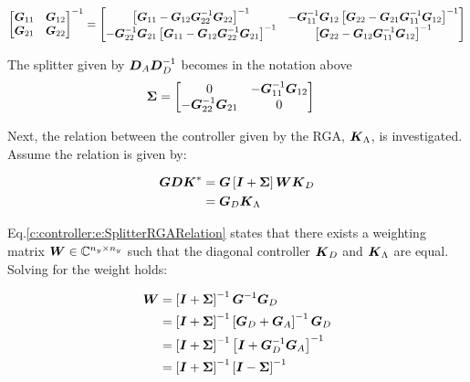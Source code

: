 \begin{align}
\begin{split}
\begin{bmatrix}
\mbox{\boldmath$G$}_{11} & \mbox{\boldmath$G$}_{12} \\
\mbox{\boldmath$G$}_{21} & \mbox{\boldmath$G$}_{22} 
\end{bmatrix}^{-1} &= \begin{bmatrix}
\left[\mbox{\boldmath$G$}_{11} - \mbox{\boldmath$G$}_{12}\mbox{\boldmath$G$}_{22}^{-1}\mbox{\boldmath$G$}_{22}\right]^{-1} & -\mbox{\boldmath$G$}_{11}^{-1}\mbox{\boldmath$G$}_{12}\left[\mbox{\boldmath$G$}_{22} - \mbox{\boldmath$G$}_{21}\mbox{\boldmath$G$}_{11}^{-1}\mbox{\boldmath$G$}_{12}\right]^{-1}  \\
-\mbox{\boldmath$G$}_{22}^{-1}\mbox{\boldmath$G$}_{21}\left[\mbox{\boldmath$G$}_{11} - \mbox{\boldmath$G$}_{12}\mbox{\boldmath$G$}_{22}^{-1}\mbox{\boldmath$G$}_{21}\right]^{-1}  & \left[\mbox{\boldmath$G$}_{22} - \mbox{\boldmath$G$}_{12}\mbox{\boldmath$G$}_{11}^{-1}\mbox{\boldmath$G$}_{12}\right]^{-1} 
\end{bmatrix} \\
\end{split}
\end{align}

The splitter given by $\mbox{\boldmath$D$}_A\mbox{\boldmath$D$}_D^{-1}$ becomes in the notation above
\begin{align}
\begin{split}
\mbox{\boldmath$\Sigma$} &= \begin{bmatrix}
0 & -\mbox{\boldmath$G$}_{11}^{-1}\mbox{\boldmath$G$}_{12}\\
-\mbox{\boldmath$G$}_{22}^{-1}\mbox{\boldmath$G$}_{21}  & 0
\end{bmatrix}
\end{split}
\label{c:controller:e:EasySplitter}
\end{align}

Next, the relation between the controller given by the RGA, $\mbox{\boldmath$K$}_{\Lambda}$, is investigated. Assume the relation is given by:

\begin{align}
\begin{split}
\mbox{\boldmath$G$}\mbox{\boldmath$D$}\mbox{\boldmath$K$}^* &= \mbox{\boldmath$G$} \left[ \mbox{\boldmath$I$} + \mbox{\boldmath$\Sigma$}\right] \mbox{\boldmath$W$} \mbox{\boldmath$K$}_D \\
&= \mbox{\boldmath$G$}_D \mbox{\boldmath$K$}_{\Lambda}
\end{split}
\label{c:controller:e:SplitterRGARelation}
\end{align}

Eq.\ref{c:controller:e:SplitterRGARelation} states that there exists a weighting matrix $\mbox{\boldmath$W$} \in \mathbb{C}^{n_y \times n_y}$ such that the diagonal controller $\mbox{\boldmath$K$}_D$ and $\mbox{\boldmath$K$}_{\Lambda}$ are equal. Solving for the weight holds:

\begin{align}
\begin{split}
\mbox{\boldmath$W$} &= \left[ \mbox{\boldmath$I$}+\mbox{\boldmath$\Sigma$}\right]^{-1} \mbox{\boldmath$G$}^{-1} \mbox{\boldmath$G$}_D \\
&= \left[  \mbox{\boldmath$I$}+\mbox{\boldmath$\Sigma$} \right]^{-1} \left[\mbox{\boldmath$G$}_D + \mbox{\boldmath$G$}_A \right]^{-1} \mbox{\boldmath$G$}_D \\  
&= \left[  \mbox{\boldmath$I$}+\mbox{\boldmath$\Sigma$} \right]^{-1} \left[\mbox{\boldmath$I$} + \mbox{\boldmath$G$}_D^{-1}\mbox{\boldmath$G$}_A \right]^{-1} \\
&= \left[  \mbox{\boldmath$I$}+\mbox{\boldmath$\Sigma$} \right]^{-1} \left[  \mbox{\boldmath$I$} - \mbox{\boldmath$\Sigma$} \right]^{-1}
\end{split}
\label{c:controller:e:PerfectDecoupling}
\end{align}

